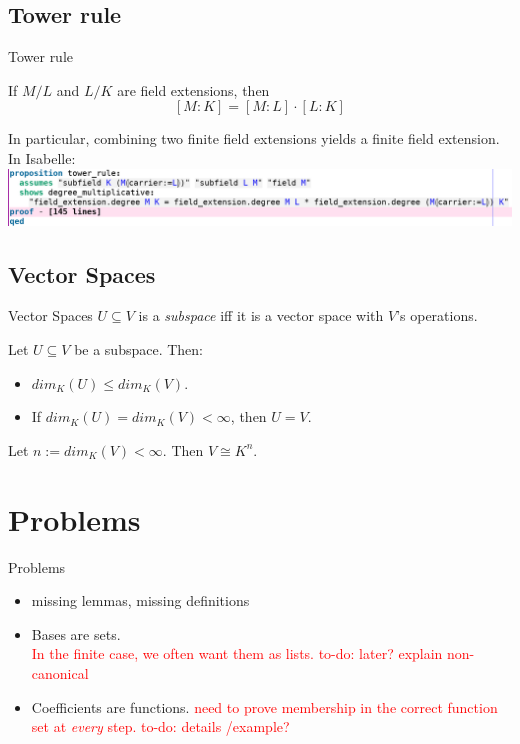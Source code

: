\documentclass[%
	sans,
	12pt,
]{beamer}
\newcommand{\bad}[1]{\textcolor{red}{#1}}
\begin{document}
\subsection{Tower rule}
\begin{frame}{Tower rule}
\begin{theorem}
If $M/L$ and $L/K$ are field extensions, then
\[[M : K] = [M : L] \cdot [L : K]\]\pause
\end{theorem}
In particular, combining two finite field extensions yields a finite field extension.\\[4mm] %
In Isabelle:\\[2mm]
\includegraphics[width=1.1\linewidth]{tower_rule}
\end{frame}

\subsection{Vector Spaces}
\begin{frame}{Vector Spaces}\pause
$U \subseteq V$ is a \emph{subspace} iff it is a vector space with $V$'s operations.
\begin{theorem}
	\upshape
	Let $U \subseteq V$ be a subspace. Then:
	\begin{itemize}
		\item $dim_K(U) \le dim_K(V)$.
		\item If $dim_K(U)=dim_K(V) < \infty$, then $U = V$.
	\end{itemize} %
\end{theorem}\pause
\begin{theorem}
	\upshape
	Let $n := dim_K(V) < \infty$. Then $V \cong K^n$.
\end{theorem}
\end{frame}

\section{Problems}
\begin{frame}{Problems}
\begin{itemize}
	\item missing lemmas, missing definitions\pause %
	\item Bases are sets.\\\pause
	\bad{In the finite case, we often want them as lists. to-do: later? explain non-canonical}
	\item Coefficients are functions.
	\bad{need to prove membership in the correct function set at \emph{every} step.
		to-do: details /example?}
\end{itemize}
\end{frame}
\end{document}

